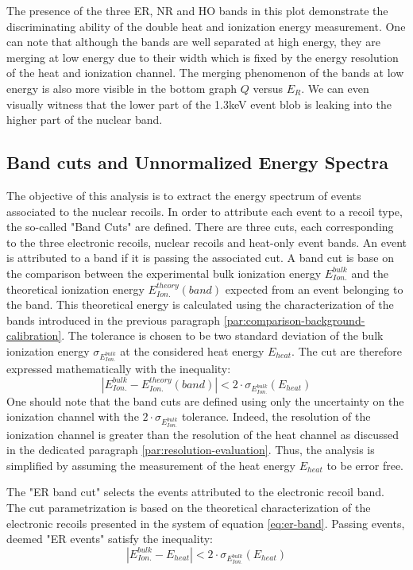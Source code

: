 The presence of the three ER, NR and HO bands in this plot demonstrate the discriminating ability of the double heat and ionization energy measurement. One can note that although the bands are well separated at high energy, they are merging at low energy due to their width which is fixed by the energy resolution of the heat and ionization channel. The merging phenomenon of the bands at low energy is also more visible in the bottom graph $Q$ versus $E_R$. We can even visually witness that the lower part of the 1.3keV event blob is leaking into the higher part of the nuclear band.


\subsection{Band cuts and Unnormalized Energy Spectra}
\label{par:band-cut}

The objective of this analysis is to extract the energy spectrum of events associated to the nuclear recoils. In order to attribute each event to a recoil type, the so-called "Band Cuts" are defined. There are three cuts, each corresponding to the three electronic recoils, nuclear recoils and heat-only event bands. An event is attributed to a band if it is passing the associated cut. A band cut is base on the comparison between the experimental bulk ionization energy $E_{Ion.}^{bulk}$ and the theoretical ionization energy $E_{Ion.}^{theory}(band)$ expected from an event belonging to the band. This theoretical energy is calculated using the characterization of the bands introduced in the previous paragraph \ref{par:comparison-background-calibration}. The tolerance is chosen to be two standard deviation of the bulk ionization energy $\sigma_{E_{Ion.}^{bulk}}$ at the considered heat energy $E_{heat}$. The cut are therefore expressed mathematically with the inequality:
\begin{equation}
|E_{Ion.}^{bulk} - E_{Ion.}^{theory}(band)| < 2 \cdot \sigma_{E_{Ion.}^{bulk}} \left( E_{heat}\right)
\end{equation}
One should note that the band cuts are defined using only the uncertainty on the ionization channel with the $2 \cdot \sigma_{E_{Ion.}^{bulk}}$ tolerance. Indeed, the resolution of the ionization channel is greater than the resolution of the heat channel as discussed in the dedicated paragraph \ref{par:resolution-evaluation}. Thus, the analysis is simplified by assuming the measurement of the heat energy $E_{heat}$ to be error free.

The "ER band cut" selects the events attributed to the electronic recoil band. The cut parametrization is based on the theoretical characterization of the electronic recoils presented in the system of equation \ref{eq:er-band}. Passing events, deemed "ER events" satisfy the inequality:
\begin{equation}
\label{eq:condition-ER-ecei}
|E_{Ion.}^{bulk} - E_ {heat}| < 2 \cdot \sigma_{E_{Ion.}^{bulk}} \left( E_{heat}\right)
\end{equation}


